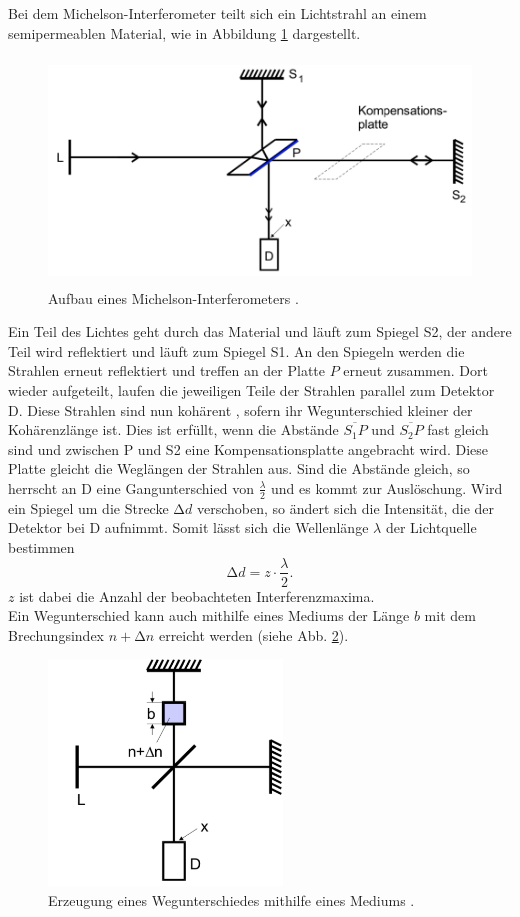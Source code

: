 Bei dem Michelson-Interferometer teilt sich ein Lichtstrahl an einem semipermeablen Material, wie in Abbildung \ref{fig:Michelson} dargestellt.
\begin{figure}
    \centering
    \includegraphics[height=6cm]{Theorie/Michelson.pdf}
    \caption{Aufbau eines Michelson-Interferometers \cite{V401}.}
    \label{fig:Michelson}
\end{figure}
Ein Teil des Lichtes geht durch das Material und läuft zum Spiegel S2, der andere Teil wird reflektiert und läuft zum Spiegel S1. An den Spiegeln werden die Strahlen erneut reflektiert und treffen an der Platte $P$ erneut zusammen. Dort wieder aufgeteilt, laufen die jeweiligen Teile der Strahlen parallel zum Detektor D. Diese Strahlen sind nun kohärent , sofern ihr Wegunterschied kleiner der Kohärenzlänge ist. Dies ist erfüllt, wenn die Abstände $\overline{S_1P}$ und $\overline{S_2P}$ fast gleich sind und zwischen P und S2 eine Kompensationsplatte angebracht wird. Diese Platte gleicht die Weglängen der Strahlen aus. Sind die Abstände gleich, so herrscht an D eine Gangunterschied von $\frac{\lambda}{2}$ und es kommt zur Auslöschung. Wird ein Spiegel um die Strecke $\increment d$ verschoben, so ändert sich die Intensität, die der Detektor bei D aufnimmt. Somit lässt sich die Wellenlänge $\lambda$ der Lichtquelle bestimmen
\begin{equation}
\label{eq:5}
	\increment d = z \cdot \frac{\lambda}{2} .
\end{equation}
$z$ ist dabei die Anzahl der beobachteten Interferenzmaxima. \\
Ein Wegunterschied kann auch mithilfe eines Mediums der Länge $b$ mit dem Brechungsindex $n + \increment n$ erreicht werden (siehe Abb. \ref{fig:Medium}).
\begin{figure}
    \centering
    \includegraphics[height=6cm]{Theorie/Medium.pdf}
    \caption{Erzeugung eines Wegunterschiedes mithilfe eines Mediums \cite{V401}.}
    \label{fig:Medium}
\end{figure}

